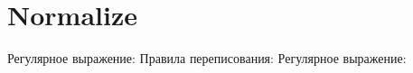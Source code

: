 \section{Normalize}
\begin{frame}{}
	Регулярное выражение:
	Правила переписования:
	Регулярное выражение:
\end{frame}
